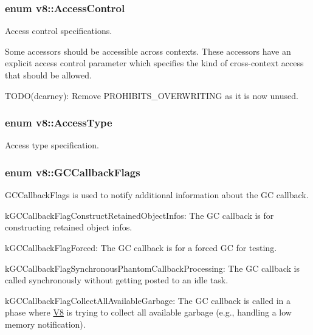 \subsubsection[{\texorpdfstring{Access\+Control}{AccessControl}}]{\setlength{\rightskip}{0pt plus 5cm}enum {\bf v8\+::\+Access\+Control}}\hypertarget{namespacev8_a31d8355cb043d7d2dda3f4a52760b64e}{}\label{namespacev8_a31d8355cb043d7d2dda3f4a52760b64e}
Access control specifications.

Some accessors should be accessible across contexts. These accessors have an explicit access control parameter which specifies the kind of cross-\/context access that should be allowed.

T\+O\+D\+O(dcarney)\+: Remove P\+R\+O\+H\+I\+B\+I\+T\+S\+\_\+\+O\+V\+E\+R\+W\+R\+I\+T\+I\+NG as it is now unused. 
\subsubsection[{\texorpdfstring{Access\+Type}{AccessType}}]{\setlength{\rightskip}{0pt plus 5cm}enum {\bf v8\+::\+Access\+Type}}\hypertarget{namespacev8_add8bef6469c5b94706584124e610046c}{}\label{namespacev8_add8bef6469c5b94706584124e610046c}
Access type specification. 
\subsubsection[{\texorpdfstring{G\+C\+Callback\+Flags}{GCCallbackFlags}}]{\setlength{\rightskip}{0pt plus 5cm}enum {\bf v8\+::\+G\+C\+Callback\+Flags}}\hypertarget{namespacev8_a247c37a849f4d6c293b9b16e94e1944b}{}\label{namespacev8_a247c37a849f4d6c293b9b16e94e1944b}
G\+C\+Callback\+Flags is used to notify additional information about the GC callback.
\begin{DoxyItemize}
\item k\+G\+C\+Callback\+Flag\+Construct\+Retained\+Object\+Infos\+: The GC callback is for constructing retained object infos.
\item k\+G\+C\+Callback\+Flag\+Forced\+: The GC callback is for a forced GC for testing.
\item k\+G\+C\+Callback\+Flag\+Synchronous\+Phantom\+Callback\+Processing\+: The GC callback is called synchronously without getting posted to an idle task.
\item k\+G\+C\+Callback\+Flag\+Collect\+All\+Available\+Garbage\+: The GC callback is called in a phase where \hyperlink{classv8_1_1_v8}{V8} is trying to collect all available garbage (e.\+g., handling a low memory notification). 
\end{DoxyItemize}
